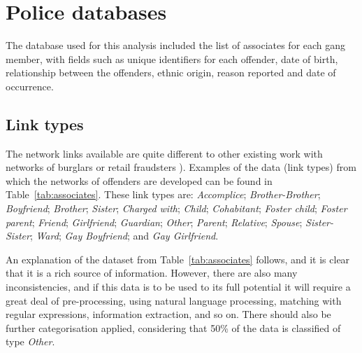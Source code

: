 \documentclass[twocolumn]{svjour3}          %
\theoremstyle{definition}
\begin{document}
\section{Police databases}\label{sec:policedatabases}

The database used for this analysis included the list of associates
for each gang member, with fields such as unique identifiers for each
offender, date of birth, relationship between the offenders, ethnic
origin, reason reported and date of occurrence.

\subsection{Link types}\label{sec:linktypes} 

The network links available are quite different to other existing work
with networks of burglars or retail fraudsters
\citep{OatleyZeleznikowLearyEwart2005,OatleyMcGarryEwart2006,oatley+crick:2014}). Examples
of the data (link types) from which the networks of offenders are
developed can be found in Table~\ref{tab:associates}. These link types
are: \emph{Accomplice}; \emph{Brother-Brother}; \emph{Boyfriend};
\emph{Brother}; \emph{Sister}; \emph{Charged with}; \emph{Child};
\emph{Cohabitant}; \emph{Foster child}; \emph{Foster parent};
\emph{Friend}; \emph{Girlfriend}; \emph{Guardian}; \emph{Other};
\emph{Parent}; \emph{Relative}; \emph{Spouse}; \emph{Sister-Sister};
\emph{Ward}; \emph{Gay Boyfriend}; and \emph{Gay Girlfriend}.

An explanation of the dataset from Table~\ref{tab:associates} follows,
and it is clear that it is a rich source of information. However,
there are also many inconsistencies, and if this data is to be used to
its full potential it will require a great deal of pre-processing,
using natural language processing, matching with regular expressions,
information extraction, and so on. There should also be further
categorisation applied, considering that 50\% of the data is
classified of type \emph{Other}.
\end{document}
